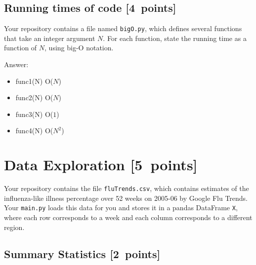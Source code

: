 \documentclass{article}
\newcommand{\blu}[1]{{\textcolor{blu}{#1}}}
\newenvironment{answer}{\par\begingroup\color{gre}Answer: }{\endgroup}
\let\ask\blu
\newcommand\pts[1]{\textcolor{pointscolour}{[#1~points]}}
\begin{document}
  \subsection{Running times of code \pts{4}}

  Your repository contains a file named \texttt{bigO.py}, which defines several functions
  that take an integer argument $N$. For each function, \ask{state the running time as a function of $N$, using big-O notation}.
  \begin{answer}
      \begin{itemize}
          \item func1(N) \Longrightarrow O($N$)
          \item func2(N) \Longrightarrow O($N$)
          \item func3(N) \Longrightarrow O($1$)
          \item func4(N) \Longrightarrow O($N^2$)
      \end{itemize}
      
  \end{answer}


  \section{Data Exploration \pts{5}}


  Your repository contains the file \texttt{fluTrends.csv}, which contains estimates
  of the influenza-like illness percentage over 52 weeks on 2005-06 by Google Flu Trends.
  Your \texttt{main.py} loads this data for you and stores it in a pandas DataFrame \texttt{X},
  where each row corresponds to a week and each column
  corresponds to a different
  region. 

  \subsection{Summary Statistics \pts{2}}
\end{document}
